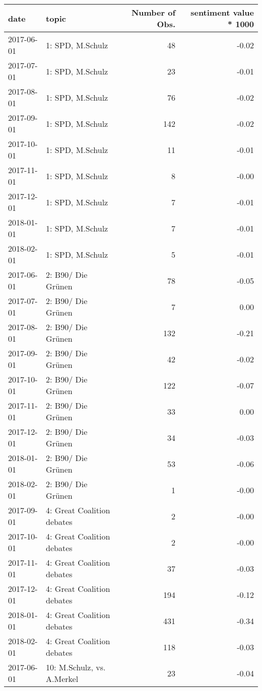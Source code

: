 \begin{table}[ht]
\centering
\begin{tabular}{llrr}
  \hline
date & topic & Number of Obs. & sentiment value * 1000 \\ 
  \hline
2017-06-01 & 1: SPD, M.Schulz &  48 & -0.02 \\ 
  2017-07-01 & 1: SPD, M.Schulz &  23 & -0.01 \\ 
  2017-08-01 & 1: SPD, M.Schulz &  76 & -0.02 \\ 
  2017-09-01 & 1: SPD, M.Schulz & 142 & -0.02 \\ 
  2017-10-01 & 1: SPD, M.Schulz &  11 & -0.01 \\ 
  2017-11-01 & 1: SPD, M.Schulz &   8 & -0.00 \\ 
  2017-12-01 & 1: SPD, M.Schulz &   7 & -0.01 \\ 
  2018-01-01 & 1: SPD, M.Schulz &   7 & -0.01 \\ 
  2018-02-01 & 1: SPD, M.Schulz &   5 & -0.01 \\ 
  2017-06-01 & 2: B90/ Die Grünen &  78 & -0.05 \\ 
  2017-07-01 & 2: B90/ Die Grünen &   7 & 0.00 \\ 
  2017-08-01 & 2: B90/ Die Grünen & 132 & -0.21 \\ 
  2017-09-01 & 2: B90/ Die Grünen &  42 & -0.02 \\ 
  2017-10-01 & 2: B90/ Die Grünen & 122 & -0.07 \\ 
  2017-11-01 & 2: B90/ Die Grünen &  33 & 0.00 \\ 
  2017-12-01 & 2: B90/ Die Grünen &  34 & -0.03 \\ 
  2018-01-01 & 2: B90/ Die Grünen &  53 & -0.06 \\ 
  2018-02-01 & 2: B90/ Die Grünen &   1 & -0.00 \\ 
  2017-09-01 & 4: Great Coalition debates &   2 & -0.00 \\ 
  2017-10-01 & 4: Great Coalition debates &   2 & -0.00 \\ 
  2017-11-01 & 4: Great Coalition debates &  37 & -0.03 \\ 
  2017-12-01 & 4: Great Coalition debates & 194 & -0.12 \\ 
  2018-01-01 & 4: Great Coalition debates & 431 & -0.34 \\ 
  2018-02-01 & 4: Great Coalition debates & 118 & -0.03 \\ 
  2017-06-01 & 10: M.Schulz, vs. A.Merkel &  23 & -0.04 \\ 

\end{tabular}
\end{table}

